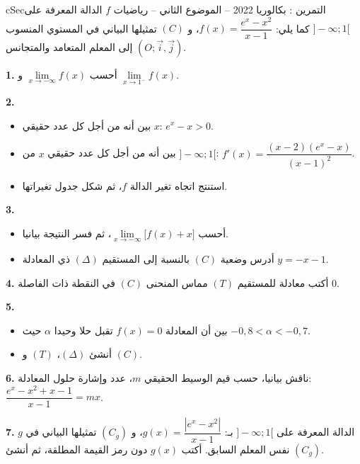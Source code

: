 \documentclass[12pt,a4paper]{article}
\newenvironment{BOX}[2]{\begin{otherlanguage}{english}\begin{arbox}{#1}{#2}}{\end{arbox}\end{otherlanguage}}
\newcounter{exo}
\newenvironment{tamrin}[1]{\stepcounter{exo}\begin{BOX}{cSec}{التمرين \theexo: #1}}{\end{BOX}}
\newenvironment{sq}{\begin{itemize}[leftmargin=2.4em,itemsep=3pt]}{\end{itemize}}
\newcommand{\qa}{\item[(أ)]}\newcommand{\qb}{\item[(ب)]}\newcommand{\qc}{\item[(جـ)]}\newcommand{\qd}{\item[(د)]}\newcommand{\qe}{\item[(هـ)]}
\newcommand{\QQ}[1]{\par\smallskip\textbf{#1.} }
\begin{document}
\begin{tamrin}{بكالوريا 2022 -- الموضوع الثاني -- رياضيات}
$f$ الدالة المعرفة على $]{-}\infty;1[$ كما يلي: $f(x)=\dfrac{e^{x}-x^2}{x-1}$، و $(C)$ تمثيلها البياني في المستوي المنسوب إلى المعلم المتعامد والمتجانس $(O;\vec i,\vec j)$.
\QQ{1} أحسب $\lim\limits_{x\to-\infty}f(x)$ و $\lim\limits_{x\to1^{-}}f(x)$.
\QQ{2}
\begin{sq}
\qa بين أنه من أجل كل عدد حقيقي $x$: $e^{x}-x>0$.
\qb بين أنه من أجل كل عدد حقيقي $x$ من $]{-}\infty;1[$: $f'(x)=\dfrac{(x-2)\left(e^{x}-x\right)}{(x-1)^2}$.
\qc استنتج اتجاه تغير الدالة $f$، ثم شكل جدول تغيراتها.
\end{sq}
\QQ{3}
\begin{sq}
\qa أحسب $\lim\limits_{x\to-\infty}\big[f(x)+x\big]$، ثم فسر النتيجة بيانيا.
\qb أدرس وضعية $(C)$ بالنسبة إلى المستقيم $(\Delta)$ ذي المعادلة $y=-x-1$.
\end{sq}
\QQ{4} أكتب معادلة للمستقيم $(T)$ مماس المنحنى $(C)$ في النقطة ذات الفاصلة $0$.
\QQ{5}
\begin{sq}
\qa بين أن المعادلة $f(x)=0$ تقبل حلا وحيدا $\alpha$ حيث $-0{,}8<\alpha<-0{,}7$.
\qb أنشئ $(\Delta)$، $(T)$ و $(C)$.
\end{sq}
\QQ{6} ناقش بيانيا، حسب قيم الوسيط الحقيقي $m$، عدد وإشارة حلول المعادلة: $\dfrac{e^{x}-x^2+x-1}{x-1}=mx$.
\QQ{7} $g$ الدالة المعرفة على $]{-}\infty;1[$ بـ: $g(x)=\dfrac{\left|e^{x}-x^2\right|}{x-1}$، و $(C_g)$ تمثيلها البياني في نفس المعلم السابق.
أكتب $g(x)$ دون رمز القيمة المطلقة، ثم أنشئ $(C_g)$.
\end{tamrin}
\end{document}

